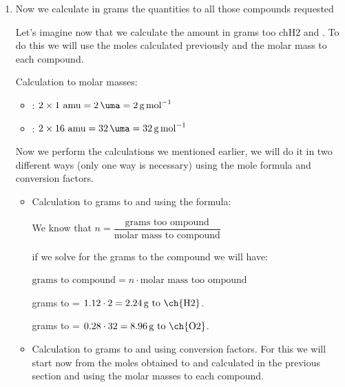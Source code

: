 \begin{enumerate}[label=\numberballmDarkTeal]
        Calculation to moles to 
        \begin{equation*}
            0.56\ \cancelred{\unit{\mol}\ \text{to \ch{H2O}}} \cdot \dfrac{\qty{2}{\mol}\ \text{to \ch{H2}}}{1\ \cancelred{\unit{\mol} \ \text{to \ch{H2O}}}} = \qty{1.12}{\mol}\ \text{to \ch{H2}}
        \end{equation*}
        Calculation to moles to 
        \begin{equation*}
            0.56\ \cancelred{\unit{\mol}\ \text{to \ch{H2O}}} \cdot \dfrac{\qty{1}{\mol}\ \text{to \ch{O2}}}{2\ \cancelred{\unit{\mol} \ \text{to \ch{H2O}}}} = \qty{0.28}{\mol}\ \text{to \ch{O2}}
        \end{equation*}
        \item Now we calculate in grams the quantities to all those compounds requested

        Let's imagine now that we calculate the amount in grams too ch{H2} and .
        To do this we will use the moles calculated previously and the molar mass to each compound.

        Calculation to molar masses:
        \begin{itemize}
            \item {}: \( 2 \times 1 \text{ amu} = \qty{2}{\uma} =  \qty{2}{\g\per\mol} \)
            \item {}: \( 2 \times 16 \text{ amu} = \qty{32}{\uma} = \qty{32}{\g\per\mol} \)
        \end{itemize}

        Now we perform the calculations we mentioned earlier, we will do it in two different ways (only one way is necessary) using the mole formula and conversion factors.
        \begin{itemize}
            \item Calculation to grams to  and  using the formula:

            We know that \( n = \dfrac{\text{grams too ompound}}{\text{molar mass to compound}} \)

            if we solve for the grams to the compound we will have:

            \( \text{grams to compound} = n\cdot \text{molar mass too ompound} \)

            grams to  = \( 1.12 \cdot 2 = \qty{2.24}{\g}\ \text{to \ch{H2}} \).

            grams to  = \( 0.28 \cdot 32 = \qty{8.96}{\g}\ \text{to \ch{O2}} \).
            \item Calculation to grams to  and  using conversion factors. For this we will start now from the moles obtained to  and  calculated in the previous section and using the molar masses to each compound.


\end{itemize}
\end{enumerate}
